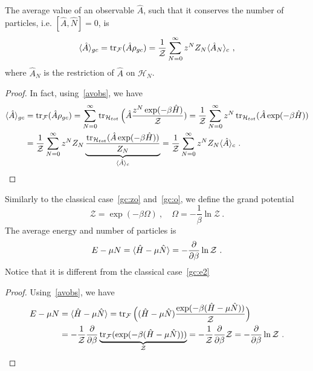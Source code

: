     The average value of an observable $\hat A$, such that it conserves the number of particles, i.e. $[\hat A, \hat N] = 0$, is
    \begin{equation}\label{qgc:av}
        \langle\hat A\rangle_{gc} = \operatorname{tr}_{\mathcal F} (\hat A \rho_{gc}) = \frac{1}{\mathcal Z} \sum_{N=0}^{\infty} z^N Z_N \langle\hat A_N\rangle_c ~,
    \end{equation}
    where $\hat A_N$ is the restriction of $\hat A$ on $\mathcal H_N$.
    \begin{proof}
        In fact, using~\eqref{avobs}, we have
        \begin{equation*}
        \begin{aligned}
            \langle\hat A\rangle_{gc} & = \operatorname{tr}_{\mathcal F} (\hat A \rho_{gc}) = \sum_{N=0}^{\infty} \operatorname{tr}_{\mathcal H_{tot}} \Big (\hat A \frac{z^N \exp(- \beta \hat H)}{\mathcal Z}) = \frac{1}{\mathcal Z} \sum_{N=0}^{\infty} z^N \operatorname{tr}_{\mathcal H_{tot}} (\hat A \exp(- \beta \hat H)) \\ & = \frac{1}{\mathcal Z} \sum_{N=0}^{\infty} z^N Z_N \underbrace{\frac{\operatorname{tr}_{\mathcal H_{tot}} (\hat A \exp(- \beta \hat H))}{Z_N}}_{\langle\hat A\rangle_c} = \frac{1}{\mathcal Z} \sum_{N=0}^{\infty} z^N Z_N \langle\hat A\rangle_c ~.
        \end{aligned}
        \end{equation*}
    \end{proof}
    
    Similarly to the classical case~\eqref{gc:zo} and~\eqref{gc:o}, we define the grand potential 
    \begin{equation}\label{qgc:o}
        \mathcal Z = \exp(- \beta \Omega) ~, \quad \Omega = - \frac{1}{\beta} \ln \mathcal Z ~.
    \end{equation}
    The average energy and number of particles is
    \begin{equation*}
        E - \mu N = \langle\hat H - \mu \hat N\rangle = - \frac{\partial}{\partial\beta} \ln \mathcal Z ~.
    \end{equation*}
    Notice that it is different from the classical case~\eqref{gc:e2}
    \begin{proof}
        Using~\eqref{avobs}, we have
        \begin{equation*}
        \begin{aligned}
            E - \mu N & = \langle\hat H - \mu \hat N\rangle  = \operatorname{tr}_{\mathcal F} \Big ( (\hat H - \mu \hat N) \frac{\exp( - \beta (\hat H - \mu \hat N))}{\mathcal Z} \Big) \\ & = - \frac{1}{\mathcal Z} \frac{\partial}{\partial\beta} \underbrace{\operatorname{tr}_{\mathcal F} (\exp(- \beta (\hat H - \mu \hat N)))}_{\mathcal Z} = - \frac{1}{\mathcal Z} \frac{\partial}{\partial\beta} \mathcal Z  = - \frac{\partial}{\partial\beta} \ln \mathcal Z ~.
        \end{aligned}
        \end{equation*}
    \end{proof}

